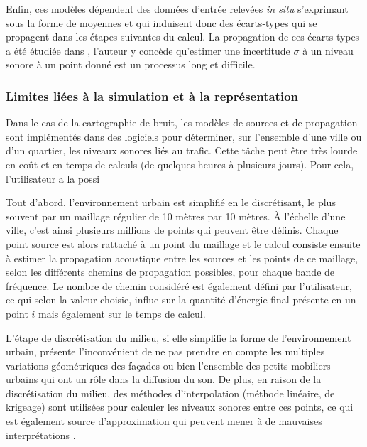 Enfin, ces modèles dépendent des données d'entrée relevées \textit{in situ} s'exprimant sous la forme de moyennes et qui induisent donc des écarts-types qui se propagent dans les étapes suivantes du calcul. La propagation de ces écarts-types a été étudiée dans \cite{probst2005uncertainties}, l'auteur y concède qu'estimer une incertitude $\sigma$ à un niveau sonore à un point donné est un processus long et difficile.

\subsubsection{Limites liées à la simulation et à la représentation}

Dans le cas de la cartographie de bruit, les modèles de sources et de propagation sont implémentés dans des logiciels pour déterminer, sur l'ensemble d'une ville ou d'un quartier, les niveaux sonores liés au trafic. Cette tâche peut être très lourde en coût et en temps de calculs (de quelques heures à plusieurs jours). Pour cela, l'utilisateur a la possi

Tout d'abord, l'environnement urbain est simplifié en le discrétisant, le plus souvent par un maillage régulier de 10 mètres par 10 mètres. À l'échelle d'une ville, c'est ainsi plusieurs millions de points qui peuvent être définis. Chaque point source est alors rattaché à un point du maillage et le calcul consiste ensuite à estimer la propagation acoustique entre les sources et les points de ce maillage, selon les différents chemins de propagation possibles, pour chaque bande de fréquence. Le nombre de chemin considéré est également défini par l'utilisateur, ce qui selon la valeur choisie, influe sur la quantité d'énergie final présente en un point $i$ mais également sur le temps de calcul.
 
L'étape de discrétisation du milieu, si elle simplifie la forme de l'environnement urbain, présente l'inconvénient de ne pas prendre en compte les multiples variations géométriques des façades ou bien l'ensemble des petits mobiliers urbains qui ont un rôle dans la diffusion du son. 
De plus, en raison de la discrétisation du milieu, des méthodes d'interpolation (méthode linéaire, de krigeage) sont utilisées pour calculer les niveaux sonores entre ces points, ce qui est également source d'approximation qui peuvent mener à de mauvaises interprétations \cite{van_leeuwen_noise_2015}.


